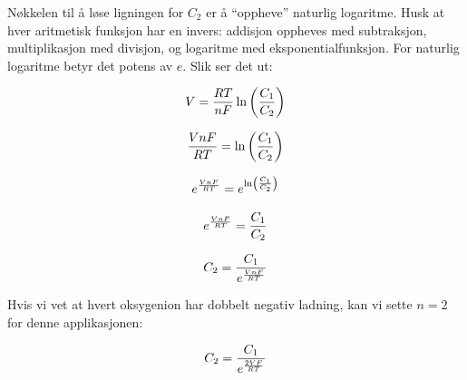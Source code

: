 





Nøkkelen til å løse ligningen for $C_2$ er å ``oppheve'' naturlig logaritme. Husk at hver aritmetisk funksjon har en invers: addisjon oppheves med subtraksjon, multiplikasjon med divisjon, og logaritme med eksponentialfunksjon. For naturlig logaritme betyr det potens av $e$. Slik ser det ut:

$$V = {{R T} \over {nF}} \ln \left({C_1 \over C_2}\right)$$

$${VnF \over RT} =  \ln \left({C_1 \over C_2}\right)$$

$$e^{VnF \over RT} =  e^{\ln \left({C_1 \over C_2}\right)}$$

$$e^{VnF \over RT} =  {C_1 \over C_2}$$

$$C_2 = {C_1 \over e^{VnF \over RT}}$$

Hvis vi vet at hvert oksygenion har dobbelt negativ ladning, kan vi sette $n = 2$ for denne applikasjonen:

$$C_2 = {C_1 \over e^{2VF \over RT}}$$



